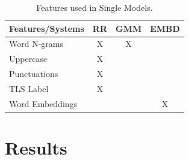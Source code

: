 \documentclass[11pt,letterpaper]{article}
\begin{document}
%
%
%
%
%
\begin{table}[ht!]\centering

\begin{tabular}{l || c c c}
Features/Systems & {\sc RR} & GMM  &EMBD \\
\hline
Word N-grams & X & X & \\
Uppercase & X& \\
Punctuations &X  & \\
TLS Label & X &\\
Word Embeddings & & &X\\
\end{tabular}
\caption{Features used in Single Models.}
\label{tbl:featuresTable}
\end{table}

\section{Results}
\end{document}

